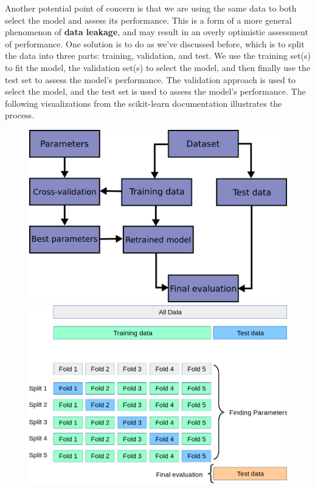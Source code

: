 \documentclass[
  letterpaper,
]{krantz}
\begin{document}
Another potential point of concern is that we are using the same data to
both select the model and assess its performance. This is a form of a
more general phenomenon of \textbf{data leakage}, and may result in an
overly optimistic assessment of performance. One solution is to do as
we've discussed before, which is to split the data into three parts:
training, validation, and test. We use the training set(s) to fit the
model, the validation set(s) to select the model, and then finally use
the test set to assess the model's performance. The validation approach
is used to select the model, and the test set is used to assess the
model's performance. The following visualizations from the scikit-learn
documentation illustrates the process.

\begin{figure}

\begin{minipage}{0.50\linewidth}

\includegraphics{img/sklearn_k_fold_images/grid_search_workflow.png}

\end{minipage}%
%
\begin{minipage}{0.50\linewidth}
\includegraphics{img/sklearn_k_fold_images/grid_search_cross_validation.png}\end{minipage}%

\end{figure}%
\end{document}
